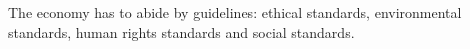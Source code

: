 The economy has to abide by guidelines: ethical standards, environmental standards, human rights standards and social standards.
